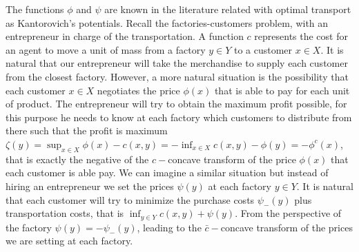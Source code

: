 The functions $\phi$ and $\psi$ are known in the literature related with optimal transport as Kantorovich's potentials. Recall the factories-customers problem, with an entrepreneur in charge of the transportation. A function $c$ represents the cost for an agent to move a unit of mass from a factory $y\in Y$ to a customer $x\in X$. It is natural that our entrepreneur will take the merchandise to supply each customer from the closest factory. However, a more natural situation is the possibility that each customer $x\in X$ negotiates the price $\phi(x)$ that is able to pay for each unit of product. The entrepreneur will try to obtain the maximum profit possible, for this purpose he needs to know at each factory which customers to distribute from there such that the profit is maximum $\zeta(y)=\sup_{x\in X}\phi(x)-c(x,y)=-\inf_{x\in X} c(x,y)-\phi(y)=-\phi^c(x)$, that is exactly the negative of the $c-$concave transform of the price $\phi(x)$ that each customer is able pay. We can imagine a similar situation but instead of hiring an entrepreneur we set the prices $\psi(y)$ at each factory $y\in Y$. It is natural that each customer will try to minimize the purchase costs $\psi_{-}(y)$ plus transportation costs, that is $\inf_{y\in Y}c(x,y)+\psi(y)$. From the perspective of the factory $\psi(y)=-\psi_{-}(y)$, leading to the $\bar{c}-$concave transform of the prices we are setting at each factory. 
	
